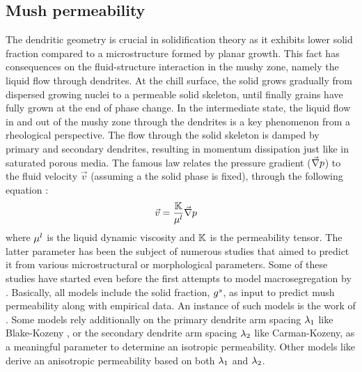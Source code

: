 \subsection{Mush permeability}
The dendritic geometry is crucial in solidification theory as it exhibits lower solid fraction compared to a microstructure formed by planar growth.
This fact has consequences on the fluid-structure interaction in the mushy zone, namely the liquid flow through dendrites. At the chill surface,
the solid  grows gradually from dispersed growing nuclei to a permeable solid skeleton, until finally grains have fully grown at the end of phase change.
In the intermediate state, the liquid flow in and out of the mushy zone through the dendrites is a key phenomenon from a rheological perspective.
The flow through the solid skeleton is damped by primary and secondary dendrites, resulting in momentum dissipation just like in saturated porous media. 
The famous \citet{darcy_les_1856} law relates the pressure gradient ($\vec{\nabla} p$) to the fluid velocity $\vec{v}$ (assuming a the solid phase is fixed), 
through the following equation \citep{rappaz_numerical_2003}:
\begin{align}
\label{eq:darcy}
& \vec{v} = \frac{\mathbb{K}}{\mu^l} \vec{\nabla} p
\end{align}
where $\mu^l$ is the liquid dynamic viscosity and $\mathbb{K}$ is the permeability tensor. The latter parameter has been the subject of numerous studies that aimed
to predict it from various microstructural or morphological parameters.
Some of these studies have started even before the first attempts to model macrosegregation by 
\citet{flemings_macrosegregation:_1967, flemings_macrosegregation:_1968-1,flemings_macrosegregation:_1968}. 
Basically, all models include the solid fraction, ${g^s}$, as input to predict mush permeability along with empirical data. 
An instance of such models is the work of \citet{xu_gravity-_1991}.
Some models rely additionally on the primary dendrite arm spacing ${\lambda}_{1}$ like Blake-Kozeny \citep{ramirez_evaluation_2003}, or the secondary 
dendrite arm spacing ${\lambda}_{2}$ like Carman-Kozeny, as a meaningful parameter to determine an isotropic permeability. 
Other models like \citet{poirier_permeability_1987,felicelli_simulation_1991} derive an anisotropic permeability based on both ${\lambda}_{1}$ and ${\lambda}_{2}$.

